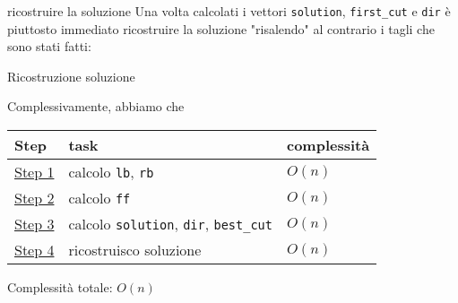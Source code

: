\vskip3mm
\hypertarget{taglialegna step 4}{} ricostruire la soluzione
\vskip3mm
Una volta calcolati i vettori \verb|solution|, \verb|first_cut| e \verb|dir| è piuttosto immediato ricostruire la soluzione "risalendo" al contrario i tagli che sono stati fatti:
\begin{algoritmo}{Ricostruzione soluzione}
	\begin{algorithm}[H]

	\end{algorithm}
\end{algoritmo}
Complessivamente, abbiamo che
\begin{center}
	\begin{tabular}{l l l}
		\toprule
		Step                                   & task                                                 & complessità          \\
		\midrule
		\hyperlink{taglialegna step 1}{Step 1} & calcolo \verb|lb|, \verb|rb|                         & $ O\left(n\right) $  \\
		\hyperlink{taglialegna step 2}{Step 2} & calcolo \verb|ff|                                    & $ O\left(n\right) $  \\
		\hyperlink{taglialegna step 3}{Step 3} & calcolo \verb|solution|, \verb|dir|, \verb|best_cut| & $ O\left(n\right) $  \\
		\hyperlink{taglialegna step 4}{Step 4} & ricostruisco soluzione                               & $  O\left(n\right) $ \\
		\bottomrule
	\end{tabular}
\end{center}
Complessità totale: $ O\left(n\right) $


